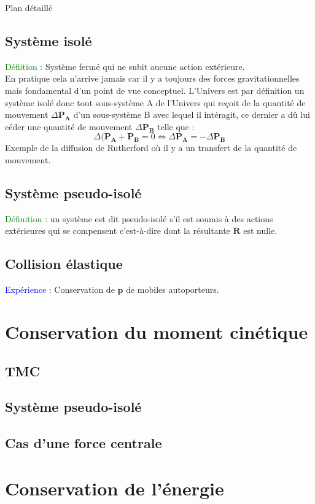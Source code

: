 \begin{reportBlock}{Plan détaillé}
\subsection{Système isolé}
\textcolor{green}{Défiition :} Système fermé qui ne subit aucune action extérieure. \\
En pratique cela n'arrive jamais car il y a toujours des forces gravitationnelles mais fondamental d'un point de vue conceptuel. L'Univers est par définition un système isolé donc tout sous-système A de l'Univers qui reçoit de la quantité de mouvement $\Delta \mathbf{P_A}$ d'un sous-système B avec lequel il intéragit, ce dernier a dû lui céder une quantité de mouvement $\Delta \mathbf{P_B}$ telle que :
\begin{equation}
    \Delta(\mathbf{P_A}+\mathbf{P_B}= 0 \Leftrightarrow \Delta\mathbf{P_A} = -\Delta\mathbf{P_B}
\end{equation}
Exemple de la diffusion de Rutherford où il y a un transfert de la quantité de mouvement.
\subsection{Système pseudo-isolé}
\textcolor{green}{Définition :} un système est dit pseudo-isolé s'il est soumis à des actions extérieures qui se compensent c'est-à-dire dont la résultante $\mathbf{R}$ est nulle.
\subsection{Collision élastique}
\textcolor{blue}{Expérience : }Conservation de $\mathbf{p}$ de mobiles autoporteurs.

\section{Conservation du moment cinétique}

\subsection{TMC}
\subsection{Système pseudo-isolé}
\subsection{Cas d'une force centrale}

\section{Conservation de l'énergie}


\end{reportBlock}
